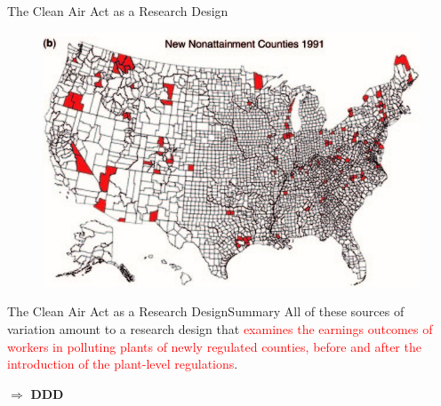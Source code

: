 \documentclass{beamer}
\begin{document}
\begin{frame}{The Clean Air Act as a Research Design}
	\begin{figure}[h]
		\centering
		\includegraphics[scale=1.1]{figure1b.jpg}
	\end{figure}
\end{frame}
\begin{frame}{The Clean Air Act as a Research Design}{Summary}
	All of these sources of variation amount to a research design that \textcolor{red}{examines the earnings outcomes of workers in polluting plants of newly regulated counties, before and after the introduction of the plant-level regulations}.
	
	$\Rightarrow$ \textbf{DDD}
\end{frame}
\end{document}
